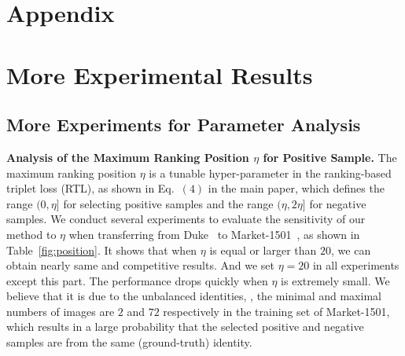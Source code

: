 \documentclass[10pt,twocolumn,letterpaper]{article}
\begin{document}
\section*{Appendix}
\setcounter{section}{0} 
\section{More Experimental Results}
\subsection{More Experiments for Parameter Analysis}
\textbf{Analysis of the Maximum Ranking Position $\eta$ for Positive Sample.}
The maximum ranking position $\eta$ is a tunable hyper-parameter in the ranking-based triplet loss (RTL), as shown in Eq.~$\left(4\right)$ in the main paper, which defines the range $(0, \eta]$ for selecting positive samples and the range $(\eta, 2\eta]$ for negative samples. 
We conduct several experiments to evaluate the sensitivity of our method to $\eta$ when transferring from Duke~\cite{duke} to Market-1501~\cite{market1501}, as shown in Table~\ref{fig:position}. 
It shows that when $\eta$ is equal or larger than $20$, we can obtain nearly same and competitive results. 
And we set $\eta=20$ in all experiments except this part. The performance drops quickly when $\eta$ is extremely small. 
We believe that it is due to the unbalanced identities, \eg, the minimal and maximal numbers of images are $2$ and $72$ respectively in the training set of Market-1501, which results in a large probability that the selected positive and negative samples are from the same (ground-truth) identity.
\end{document}
